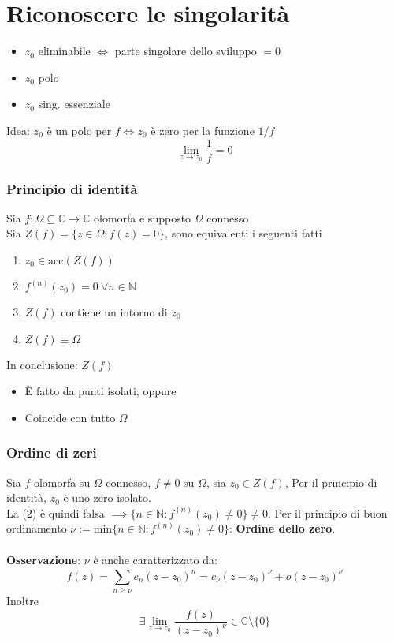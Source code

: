 \documentclass[a4paper]{article}
\newcommand{\N}{\mathbb{N}}
\newcommand{\C}{\mathbb{C}}
\begin{document}
\section{Riconoscere le singolarità}
\begin{itemize}
	\item $z_0$ eliminabile $\iff$ parte singolare dello sviluppo $=0$
	\item $z_0$ polo 
	\item $z_0$ sing. essenziale 
\end{itemize}
Idea: $z_0$ è un polo per $f\iff z_0 $ è zero per la funzione $1/f$
\[\lim_{z \to z_0} \frac{1}{f}=0\]
\subsubsection{Principio di identità}
Sia $f:\Omega \subseteq  \C\to \C$ olomorfa e supposto $\Omega$ connesso
\\Sia $Z(f)=\{z\in\Omega : f(z)=0\} $, sono equivalenti i seguenti fatti
\begin{enumerate}
	
	\item $z_0\in \text{acc}(Z(f))$
	\item $f^{(n)}(z_0)=0\ \forall n\in\N$
	\item $Z(f)$ contiene un intorno di $z_0$
	\item $Z(f)\equiv\Omega$
\end{enumerate}
In conclusione: $Z(f)$
\begin{itemize}
	\item È fatto da punti isolati, oppure 
	\item Coincide con tutto $\Omega$ 
\end{itemize}
\subsubsection{Ordine di zeri}
Sia $f$ olomorfa su $\Omega$ connesso, $f\neq 0$ su $\Omega$, sia $z_0\in Z(f)$, Per il principio di identità, $z_0$ è uno zero isolato.
\\La (2) è quindi falsa $\implies \{n\in\N: f^{(n)}(z_0)\neq 0\} \neq 0$. Per il principio di buon ordinamento $\nu := \text{min}\{n\in\N: f^{(n)}(z_0)\neq 0\} $: \textbf{Ordine dello zero}.\\
\\\textbf{Osservazione}: $\nu$ è anche caratterizzato da:
\[f(z)=\sum_{n\ge \nu}^{} c_n(z-z_0)^n=c_\nu(z-z_0)^\nu+o(z-z_0)^\nu\]
Inoltre
\[\exists \lim_{z \to z_0} \frac{f(z)}{(z-z_0)^\nu}\in\C\setminus \{0\} \]
\end{document}
